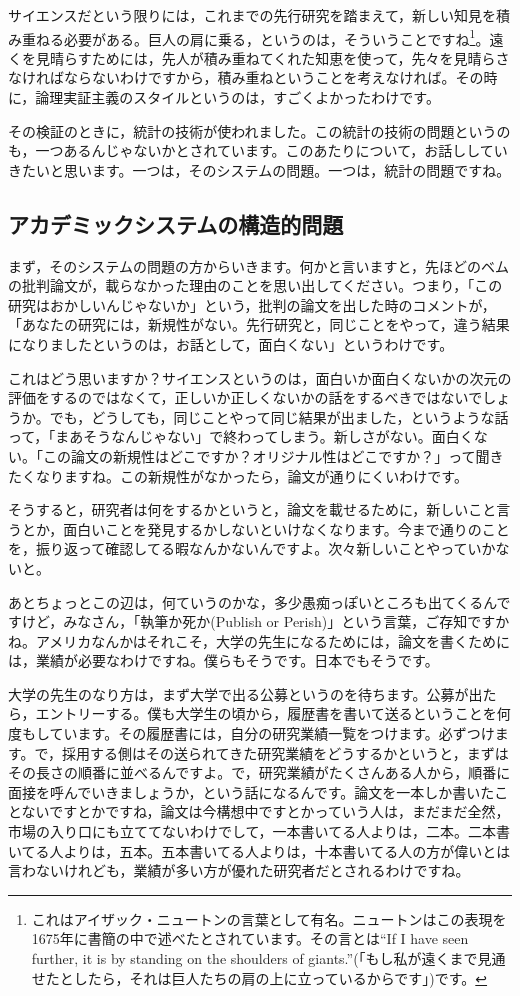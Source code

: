 \documentclass{ltjsbook}
\begin{document}
サイエンスだという限りには，これまでの先行研究を踏まえて，新しい知見を積み重ねる必要がある。巨人の肩に乗る，というのは，そういうことですね\footnote{これはアイザック・ニュートンの言葉として有名。ニュートンはこの表現を1675年に書簡の中で述べたとされています。その言とは``If I have seen further, it is by standing on the shoulders of giants.''(「もし私が遠くまで見通せたとしたら，それは巨人たちの肩の上に立っているからです」)です。}。遠くを見晴らすためには，先人が積み重ねてくれた知恵を使って，先々を見晴らさなければならないわけですから，積み重ねということを考えなければ。その時に，論理実証主義のスタイルというのは，すごくよかったわけです。

その検証のときに，統計の技術が使われました。この統計の技術の問題というのも，一つあるんじゃないかとされています。このあたりについて，お話ししていきたいと思います。一つは，そのシステムの問題。一つは，統計の問題ですね。

\subsection{アカデミックシステムの構造的問題}
まず，そのシステムの問題の方からいきます。何かと言いますと，先ほどのベムの批判論文が，載らなかった理由のことを思い出してください。つまり，「この研究はおかしいんじゃないか」という，批判の論文を出した時のコメントが，「あなたの研究には，新規性がない。先行研究と，同じことをやって，違う結果になりましたというのは，お話として，面白くない」というわけです。

これはどう思いますか？サイエンスというのは，面白いか面白くないかの次元の評価をするのではなくて，正しいか正しくないかの話をするべきではないでしょうか。でも，どうしても，同じことやって同じ結果が出ました，というような話って，「まあそうなんじゃない」で終わってしまう。新しさがない。面白くない。「この論文の新規性はどこですか？オリジナル性はどこですか？」って聞きたくなりますね。この新規性がなかったら，論文が通りにくいわけです。

そうすると，研究者は何をするかというと，論文を載せるために，新しいこと言うとか，面白いことを発見するかしないといけなくなります。今まで通りのことを，振り返って確認してる暇なんかないんですよ。次々新しいことやっていかないと。

あとちょっとこの辺は，何ていうのかな，多少愚痴っぽいところも出てくるんですけど，みなさん，「執筆か死か(Publish or Perish)」という言葉，ご存知ですかね。アメリカなんかはそれこそ，大学の先生になるためには，論文を書くためには，業績が必要なわけですね。僕らもそうです。日本でもそうです。

大学の先生のなり方は，まず大学で出る公募というのを待ちます。公募が出たら，エントリーする。僕も大学生の頃から，履歴書を書いて送るということを何度もしています。その履歴書には，自分の研究業績一覧をつけます。必ずつけます。で，採用する側はその送られてきた研究業績をどうするかというと，まずはその長さの順番に並べるんですよ。で，研究業績がたくさんある人から，順番に面接を呼んでいきましょうか，という話になるんです。論文を一本しか書いたことないですとかですね，論文は今構想中ですとかっていう人は，まだまだ全然，市場の入り口にも立ててないわけでして，一本書いてる人よりは，二本。二本書いてる人よりは，五本。五本書いてる人よりは，十本書いてる人の方が偉いとは言わないけれども，業績が多い方が優れた研究者だとされるわけですね。
\end{document}
